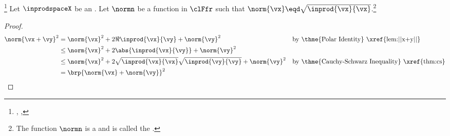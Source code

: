 \begin{theorem}
\footnote{
  ,
  ,
  }
\label{thm:vsi_minkowski}
\label{thm:minkowineq}
Let $\inprodspaceX$ be an .
Let $\normn$ be a function in $\clFfr$ such that $\norm{\vx}\eqd\sqrt{\inprod{\vx}{\vx}}$.\footnote{
The function $\normn$ is a   and is called the 
.}
\thmbox{
  \norm{\vx+\vy} \le \norm{\vx}+\norm{\vy}
  \quad\sst
  \forall \vx,\vy\in\setX
  }
\end{theorem}
\begin{proof}
  \begin{align*}
    \norm{\vx+\vy}^2
      &=    \norm{\vx}^2 +2\Re{\inprod{\vx}{\vy}} + \norm{\vy}^2 
      &&    \text{by \thme{Polar Identity} \xref{lem:||x+y||}}
    \\&\le  \norm{\vx}^2 + 2\abs{\inprod{\vx}{\vy}} +\norm{\vy}^2
    \\&\le  \norm{\vx}^2 + 2\sqrt{\inprod{\vx}{\vx}} \sqrt{\inprod{\vy}{\vy}} + \norm{\vy}^2
      &&    \text{by \thme{Cauchy-Schwarz Inequality} \xref{thm:cs}}
    \\&=    \brp{\norm{\vx} + \norm{\vy}}^2
  \end{align*}
\end{proof}

